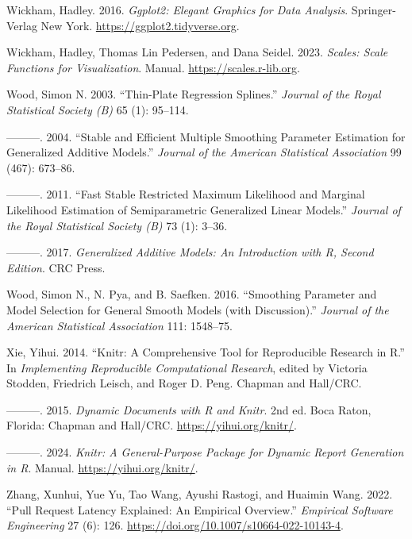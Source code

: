 \documentclass[
]{article}
\newlength{\cslhangindent}
\newenvironment{CSLReferences}[2] %
 {\begin{list}{}{%
  \setlength{\itemindent}{0pt}
  \setlength{\leftmargin}{0pt}
  \setlength{\parsep}{0pt}
  \ifodd #1
   \setlength{\leftmargin}{\cslhangindent}
   \setlength{\itemindent}{-1\cslhangindent}
  \fi
  \setlength{\itemsep}{#2\baselineskip}}}
 {\end{list}}
\begin{document}
\begin{CSLReferences}{1}{0}
Wickham, Hadley. 2016. \emph{Ggplot2: {Elegant} Graphics for Data
Analysis}. Springer-Verlag New York.
\url{https://ggplot2.tidyverse.org}.

Wickham, Hadley, Thomas Lin Pedersen, and Dana Seidel. 2023.
\emph{Scales: {Scale} Functions for Visualization}. Manual.
\url{https://scales.r-lib.org}.

Wood, Simon N. 2003. {``Thin-Plate Regression Splines.''} \emph{Journal
of the Royal Statistical Society (B)} 65 (1): 95--114.

---------. 2004. {``Stable and Efficient Multiple Smoothing Parameter
Estimation for Generalized Additive Models.''} \emph{Journal of the
American Statistical Association} 99 (467): 673--86.

---------. 2011. {``Fast Stable Restricted Maximum Likelihood and
Marginal Likelihood Estimation of Semiparametric Generalized Linear
Models.''} \emph{Journal of the Royal Statistical Society (B)} 73 (1):
3--36.

---------. 2017. \emph{Generalized {Additive Models}: {An Introduction}
with {R}, {Second Edition}}. CRC Press.

Wood, Simon N., N. Pya, and B. Saefken. 2016. {``Smoothing Parameter and
Model Selection for General Smooth Models (with Discussion).''}
\emph{Journal of the American Statistical Association} 111: 1548--75.

Xie, Yihui. 2014. {``Knitr: A Comprehensive Tool for Reproducible
Research in {R}.''} In \emph{Implementing Reproducible Computational
Research}, edited by Victoria Stodden, Friedrich Leisch, and Roger D.
Peng. {Chapman and Hall/CRC}.

---------. 2015. \emph{Dynamic Documents with {R} and Knitr}. 2nd ed.
Boca Raton, Florida: {Chapman and Hall/CRC}.
\url{https://yihui.org/knitr/}.

---------. 2024. \emph{Knitr: A General-Purpose Package for Dynamic
Report Generation in {R}}. Manual. \url{https://yihui.org/knitr/}.

Zhang, Xunhui, Yue Yu, Tao Wang, Ayushi Rastogi, and Huaimin Wang. 2022.
{``Pull Request Latency Explained: An Empirical Overview.''}
\emph{Empirical Software Engineering} 27 (6): 126.
\url{https://doi.org/10.1007/s10664-022-10143-4}.

\end{CSLReferences}
\end{document}
